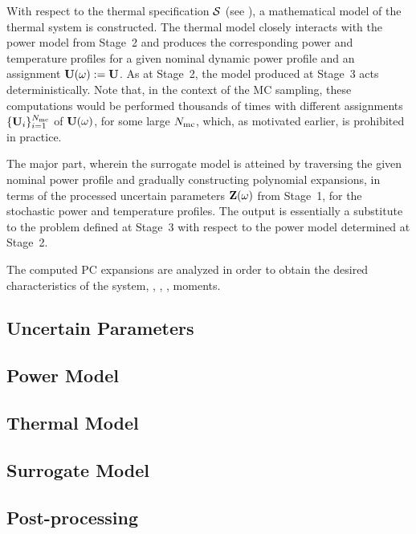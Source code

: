  With respect to the thermal specification $\mathcal{S}$ (see ), a mathematical model of the thermal system is constructed. The thermal model closely interacts with the power model from Stage~2 and produces the corresponding power and temperature profiles for a given nominal dynamic power profile and an assignment $\mathbf{U}(\omega) := \mathbf{U}$. As at Stage~2, the model produced at Stage~3 acts deterministically. Note that, in the context of the MC sampling, these computations would be performed thousands of times with different assignments $\{ \mathbf{U}_i \}_{i = 1}^{N_\text{mc}}$ of $\mathbf{U}(\omega)$, for some large $N_\text{mc}$, which, as motivated earlier, is prohibited in practice.

 The major part, wherein the surrogate model is atteined by traversing the given nominal power profile and gradually constructing polynomial expansions, in terms of the processed uncertain parameters $\mathbf{Z}(\omega)$ from Stage~1, for the stochastic power and temperature profiles. The output is essentially a substitute to the problem defined at Stage~3 with respect to the power model determined at Stage~2.

 The computed PC expansions are analyzed in order to obtain the desired characteristics of the system, \eg, \cdfs, \pdfs, moments.

\subsection{Uncertain Parameters} 


\subsection{Power Model} 


\subsection{Thermal Model} 


\subsection{Surrogate Model} 


\subsection{Post-processing} 

